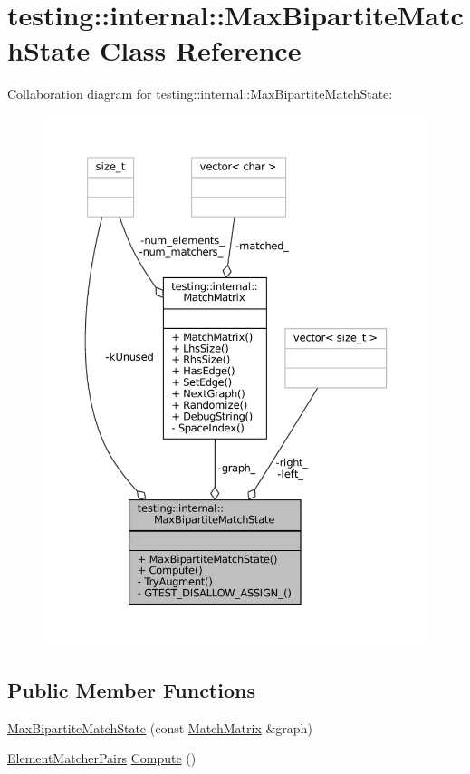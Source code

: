 \hypertarget{classtesting_1_1internal_1_1MaxBipartiteMatchState}{}\section{testing\+:\+:internal\+:\+:Max\+Bipartite\+Match\+State Class Reference}
\label{classtesting_1_1internal_1_1MaxBipartiteMatchState}


Collaboration diagram for testing\+:\+:internal\+:\+:Max\+Bipartite\+Match\+State\+:
\nopagebreak
\begin{figure}[H]
\begin{center}
\leavevmode
\includegraphics[width=350pt]{classtesting_1_1internal_1_1MaxBipartiteMatchState__coll__graph}
\end{center}
\end{figure}
\subsection*{Public Member Functions}
\begin{DoxyCompactItemize}
\item 
\hyperlink{classtesting_1_1internal_1_1MaxBipartiteMatchState_a9d0166d5cc7afd1b741f6c312df72b54}{Max\+Bipartite\+Match\+State} (const \hyperlink{classtesting_1_1internal_1_1MatchMatrix}{Match\+Matrix} \&graph)
\item 
\hyperlink{namespacetesting_1_1internal_a0038618710c01a71150887dc7cfb0a29}{Element\+Matcher\+Pairs} \hyperlink{classtesting_1_1internal_1_1MaxBipartiteMatchState_af6efab664ee390925b24d023f1368192}{Compute} ()
\end{DoxyCompactItemize}
